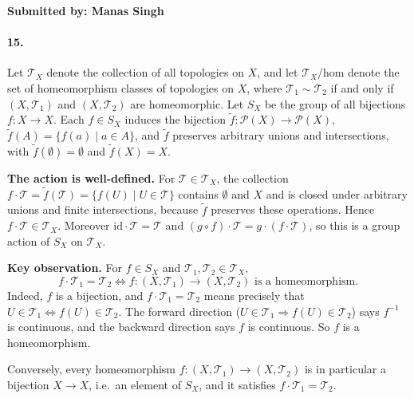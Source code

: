 \documentclass[12pt]{article}
\newcommand{\submittedby}[1]{%
    \noindent\textbf{Submitted by: #1}\par
}
\begin{document}
\submittedby{Manas Singh}

\paragraph{15.} Let $\mathcal{T}_X$ denote the collection of all topologies on $X$, and let $\mathcal{T}_X/\text{hom}$ denote the set of homeomorphism classes of topologies on $X$, where $\mathcal{T}_1 \sim \mathcal{T}_2$ if and only if $(X,\mathcal{T}_1)$ and $(X,\mathcal{T}_2)$ are homeomorphic. Let $S_X$ be the group of all bijections $f: X \to X$. Each $f \in S_X$ induces the bijection $\tilde{f}: \mathcal{P}(X) \to \mathcal{P}(X)$, $\tilde{f}(A) = \{f(a) \mid a \in A\}$, and $\tilde f$ preserves arbitrary unions and intersections, with $\tilde f(\emptyset)=\emptyset$ and $\tilde f(X)=X$.

\textbf{The action is well-defined.} For $\mathcal{T} \in \mathcal{T}_X$, the collection $f\cdot\mathcal{T} = \tilde{f}(\mathcal{T}) = \{f(U) \mid U \in \mathcal{T}\}$ contains $\emptyset$ and $X$ and is closed under arbitrary unions and finite intersections, because $\tilde f$ preserves these operations. Hence $f\cdot\mathcal{T} \in \mathcal{T}_X$. Moreover $\mathrm{id}\cdot\mathcal{T}=\mathcal{T}$ and $(g\circ f)\cdot\mathcal{T} = g\cdot(f\cdot\mathcal{T})$, so this is a group action of $S_X$ on $\mathcal{T}_X$.

\textbf{Key observation.} For $f\in S_X$ and $\mathcal{T}_1,\mathcal{T}_2\in\mathcal{T}_X$,
\[
f\cdot\mathcal{T}_1=\mathcal{T}_2 \iff f:(X,\mathcal{T}_1)\to(X,\mathcal{T}_2) \text{ is a homeomorphism.}
\]
Indeed, $f$ is a bijection, and $f\cdot\mathcal{T}_1=\mathcal{T}_2$ means precisely that $U\in\mathcal{T}_1 \iff f(U)\in\mathcal{T}_2$. The forward direction ($U \in \mathcal{T}_1 \Rightarrow f(U)\in\mathcal{T}_2$) says $f^{-1}$ is continuous, and the backward direction says $f$ is continuous. So $f$ is a homeomorphism.

Conversely, every homeomorphism $f:(X,\mathcal{T}_1)\to(X,\mathcal{T}_2)$ is in particular a bijection $X\to X$, i.e.\ an element of $S_X$, and it satisfies $f\cdot\mathcal{T}_1=\mathcal{T}_2$.
\end{document}
